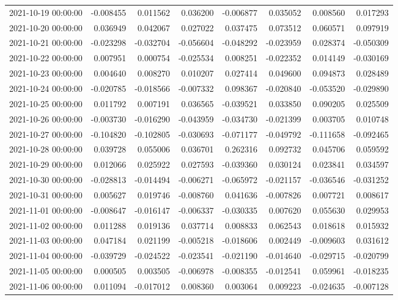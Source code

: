 \begin{tabular}{lrrrrrrr}
2021-10-19 00:00:00 & -0.008455 & 0.011562 & 0.036200 & -0.006877 & 0.035052 & 0.008560 & 0.017293 \\
2021-10-20 00:00:00 & 0.036949 & 0.042067 & 0.027022 & 0.037475 & 0.073512 & 0.060571 & 0.097919 \\
2021-10-21 00:00:00 & -0.023298 & -0.032704 & -0.056604 & -0.048292 & -0.023959 & 0.028374 & -0.050309 \\
2021-10-22 00:00:00 & 0.007951 & 0.000754 & -0.025534 & 0.008251 & -0.022352 & 0.014149 & -0.030169 \\
2021-10-23 00:00:00 & 0.004640 & 0.008270 & 0.010207 & 0.027414 & 0.049600 & 0.094873 & 0.028489 \\
2021-10-24 00:00:00 & -0.020785 & -0.018566 & -0.007332 & 0.098367 & -0.020840 & -0.053520 & -0.029890 \\
2021-10-25 00:00:00 & 0.011792 & 0.007191 & 0.036565 & -0.039521 & 0.033850 & 0.090205 & 0.025509 \\
2021-10-26 00:00:00 & -0.003730 & -0.016290 & -0.043959 & -0.034730 & -0.021399 & 0.003705 & 0.010748 \\
2021-10-27 00:00:00 & -0.104820 & -0.102805 & -0.030693 & -0.071177 & -0.049792 & -0.111658 & -0.092465 \\
2021-10-28 00:00:00 & 0.039728 & 0.055006 & 0.036701 & 0.262316 & 0.092732 & 0.045706 & 0.059592 \\
2021-10-29 00:00:00 & 0.012066 & 0.025922 & 0.027593 & -0.039360 & 0.030124 & 0.023841 & 0.034597 \\
2021-10-30 00:00:00 & -0.028813 & -0.014494 & -0.006271 & -0.065972 & -0.021157 & -0.036546 & -0.031252 \\
2021-10-31 00:00:00 & 0.005627 & 0.019746 & -0.008760 & 0.041636 & -0.007826 & 0.007721 & 0.008617 \\
2021-11-01 00:00:00 & -0.008647 & -0.016147 & -0.006337 & -0.030335 & 0.007620 & 0.055630 & 0.029953 \\
2021-11-02 00:00:00 & 0.011288 & 0.019136 & 0.037714 & 0.008833 & 0.062543 & 0.018618 & 0.015932 \\
2021-11-03 00:00:00 & 0.047184 & 0.021199 & -0.005218 & -0.018606 & 0.002449 & -0.009603 & 0.031612 \\
2021-11-04 00:00:00 & -0.039729 & -0.024522 & -0.023541 & -0.021190 & -0.014640 & -0.029715 & -0.020799 \\
2021-11-05 00:00:00 & 0.000505 & 0.003505 & -0.006978 & -0.008355 & -0.012541 & 0.059961 & -0.018235 \\
2021-11-06 00:00:00 & 0.011094 & -0.017012 & 0.008360 & 0.003064 & 0.009223 & -0.024635 & -0.007128 \\

\end{tabular}
